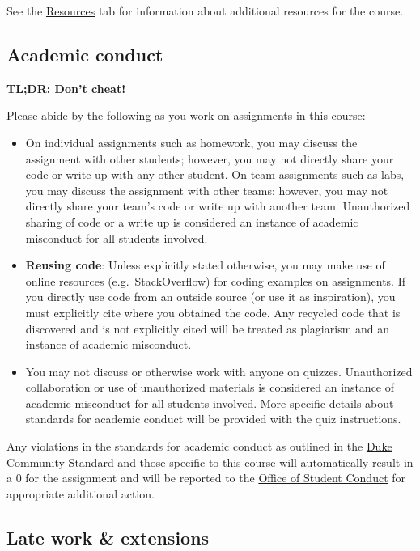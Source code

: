 \documentclass[
]{article}
\begin{document}
See the \href{/resources/}{Resources} tab for information about
additional resources for the course.

\hypertarget{academic-conduct}{%
\subsection{Academic conduct}\label{academic-conduct}}

\textbf{TL;DR: Don't cheat!}

Please abide by the following as you work on assignments in this course:

\begin{itemize}
\item
  On individual assignments such as homework, you may discuss the
  assignment with other students; however, you may not directly share
  your code or write up with any other student. On team assignments such
  as labs, you may discuss the assignment with other teams; however, you
  may not directly share your team's code or write up with another team.
  Unauthorized sharing of code or a write up is considered an instance
  of academic misconduct for all students involved.
\item
  \textbf{Reusing code}: Unless explicitly stated otherwise, you may
  make use of online resources (e.g.~StackOverflow) for coding examples
  on assignments. If you directly use code from an outside source (or
  use it as inspiration), you must explicitly cite where you obtained
  the code. Any recycled code that is discovered and is not explicitly
  cited will be treated as plagiarism and an instance of academic
  misconduct.
\item
  You may not discuss or otherwise work with anyone on quizzes.
  Unauthorized collaboration or use of unauthorized materials is
  considered an instance of academic misconduct for all students
  involved. More specific details about standards for academic conduct
  will be provided with the quiz instructions.
\end{itemize}

Any violations in the standards for academic conduct as outlined in the
\href{https://studentaffairs.duke.edu/conduct/about-us/duke-community-standard}{Duke
Community Standard} and those specific to this course will automatically
result in a 0 for the assignment and will be reported to the
\href{https://studentaffairs.duke.edu/conduct}{Office of Student
Conduct} for appropriate additional action.

\hypertarget{late-work-extensions}{%
\subsection{Late work \& extensions}\label{late-work-extensions}}
\end{document}
